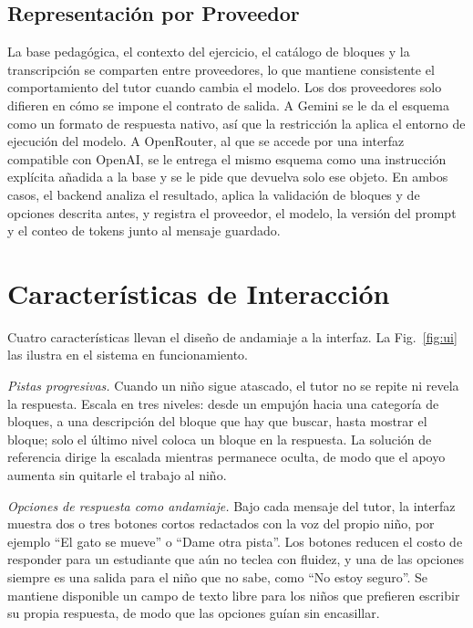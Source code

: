 \documentclass[conference]{IEEEtran}
\begin{document}
\subsection{Representación por Proveedor}

La base pedagógica, el contexto del ejercicio, el catálogo de bloques y la transcripción se comparten entre proveedores, lo que mantiene consistente el comportamiento del tutor cuando cambia el modelo. Los dos proveedores solo difieren en cómo se impone el contrato de salida. A Gemini se le da el esquema como un formato de respuesta nativo, así que la restricción la aplica el entorno de ejecución del modelo. A OpenRouter, al que se accede por una interfaz compatible con OpenAI, se le entrega el mismo esquema como una instrucción explícita añadida a la base y se le pide que devuelva solo ese objeto. En ambos casos, el backend analiza el resultado, aplica la validación de bloques y de opciones descrita antes, y registra el proveedor, el modelo, la versión del prompt y el conteo de tokens junto al mensaje guardado.

\section{Características de Interacción}
\label{sec:features}

Cuatro características llevan el diseño de andamiaje a la interfaz. La Fig.~\ref{fig:ui} las ilustra en el sistema en funcionamiento.

\emph{Pistas progresivas.} Cuando un niño sigue atascado, el tutor no se repite ni revela la respuesta. Escala en tres niveles: desde un empujón hacia una categoría de bloques, a una descripción del bloque que hay que buscar, hasta mostrar el bloque; solo el último nivel coloca un bloque en la respuesta. La solución de referencia dirige la escalada mientras permanece oculta, de modo que el apoyo aumenta sin quitarle el trabajo al niño.

\emph{Opciones de respuesta como andamiaje.} Bajo cada mensaje del tutor, la interfaz muestra dos o tres botones cortos redactados con la voz del propio niño, por ejemplo ``El gato se mueve'' o ``Dame otra pista''. Los botones reducen el costo de responder para un estudiante que aún no teclea con fluidez, y una de las opciones siempre es una salida para el niño que no sabe, como ``No estoy seguro''. Se mantiene disponible un campo de texto libre para los niños que prefieren escribir su propia respuesta, de modo que las opciones guían sin encasillar.
\end{document}
